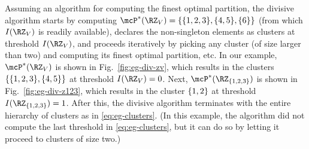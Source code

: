 \begin{example}
	Assuming an algorithm for computing the
	finest optimal partition, the divisive algorithm starts by computing 
	$\mcP^{*}(\RZ_V) = \Set{\Set{1,2,3},\Set{4,5},\Set{6}}$ (from which $I(\RZ_V)$ is readily
	available), declares the non-singleton elements as clusters at threshold $I(\RZ_V)$,
	and proceeds iteratively by picking any cluster (of size larger than two) and computing its
	finest optimal partition, etc.
	In our example, $\mcP^{*}(\RZ_V)$ is shown in Fig.~\ref{fig:eg-div-zv}, which results in the clusters $\{\{1,2,3\}, \{4,5\}\}$ at threshold $I(\RZ_{V}) = 0$.
	Next, $\mcP^{*}(\RZ_{\Set{1,2,3}})$ is shown in Fig.~\ref{fig:eg-div-z123}, which results in the cluster $\{1,2\}$ at threshold $I(\RZ_{\Set{1,2,3}}) = 1$.
	After this, the divisive algorithm terminates with the entire hierarchy of clusters as in \eqref{eq:eg-clusters}.
	(In this example, the algorithm did not compute the last threshold in \eqref{eq:eg-clusters}, but it can do
	so by letting it proceed to clusters of size two.)
\end{example}

